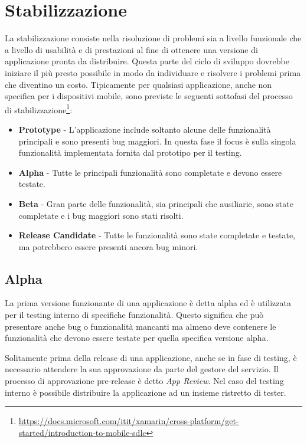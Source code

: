 \section{Stabilizzazione}
La stabilizzazione consiste nella risoluzione di problemi sia a livello funzionale che a livello di usabilità e di prestazioni al fine di ottenere una versione di applicazione pronta da distribuire. Questa parte del ciclo di sviluppo dovrebbe iniziare il più presto possibile in modo da individuare e risolvere i problemi prima che diventino un costo. Tipicamente per qualsiasi applicazione, anche non specifica per i dispositivi mobile, sono previste le seguenti sottofasi del processo di stabilizzazione\footnote{\href{https://docs.microsoft.com/itit/xamarin/cross-platform/get-started/introduction-to-mobile-sdlc}{https://docs.microsoft.com/itit/xamarin/cross-platform/get-started/introduction-to-mobile-sdlc}}:
\begin{itemize}
    \item \textbf{Prototype} - L'applicazione include soltanto alcune delle funzionalità principali e sono presenti bug maggiori. In questa fase il focus è sulla singola funzionalità implementata fornita dal prototipo per il testing.
    \item \textbf{Alpha} - Tutte le principali funzionalità sono completate e devono essere testate.
    \item \textbf{Beta} - Gran parte delle funzionalità, sia principali che ausiliarie, sono state completate e i bug maggiori sono stati risolti.
    \item \textbf{Release Candidate} - Tutte le funzionalità sono state completate e testate, ma potrebbero essere presenti ancora bug minori.
\end{itemize}

\subsection{Alpha}
La prima versione funzionante di una applicazione è detta alpha ed è utilizzata per il testing interno di specifiche funzionalità. Questo significa che può presentare anche bug o funzionalità mancanti ma almeno deve contenere le funzionalità che devono essere testate per quella specifica versione alpha.

Solitamente prima della release di una applicazione, anche se in fase di testing, è necessario attendere la sua approvazione da parte del gestore del servizio. Il processo di approvazione pre-release è detto \textit{App Review}. Nel caso del testing interno è possibile distribuire la applicazione ad un insieme ristretto di tester.

